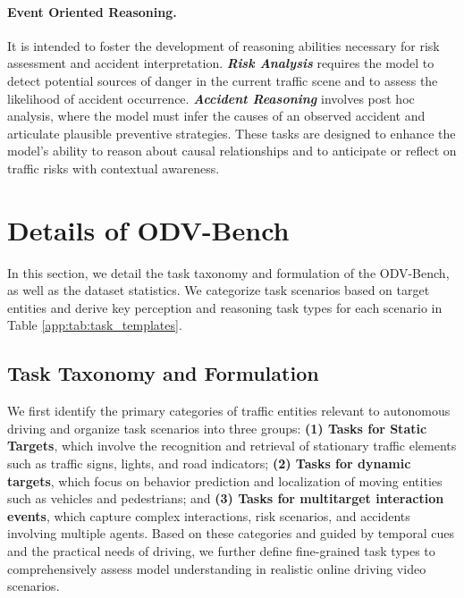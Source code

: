 \paragraph{Event Oriented Reasoning.}
It is intended to foster the development of reasoning abilities necessary for risk assessment and accident interpretation. \textit{\textbf{Risk Analysis}} requires the model to detect potential sources of danger in the current traffic scene and to assess the likelihood of accident occurrence. \textit{\textbf{Accident Reasoning}} involves post hoc analysis, where the model must infer the causes of an observed accident and articulate plausible preventive strategies. These tasks are designed to enhance the model’s ability to reason about causal relationships and to anticipate or reflect on traffic risks with contextual awareness.








\section{Details of ODV-Bench}
\label{app:sec:Details_of_ODVBench}


In this section, we detail the task taxonomy and formulation of the ODV-Bench, as well as the dataset statistics. We categorize task scenarios based on target entities and derive key perception and reasoning task types for each scenario in Table \ref{app:tab:task_templates}.



\subsection{Task Taxonomy and Formulation}
\label{app:sec:Details_of_ODVBench:Task}
We first identify the primary categories of traffic entities relevant to autonomous driving and organize task scenarios into three groups:\textbf{ (1) Tasks for Static Targets}, which involve the recognition and retrieval of stationary traffic elements such as traffic signs, lights, and road indicators; \textbf{ (2) Tasks for dynamic targets}, which focus on behavior prediction and localization of moving entities such as vehicles and pedestrians; and \textbf{ (3) Tasks for multitarget interaction events}, which capture complex interactions, risk scenarios, and accidents involving multiple agents. Based on these categories and guided by temporal cues and the practical needs of driving, we further define fine-grained task types to comprehensively assess model understanding in realistic online driving video scenarios.

